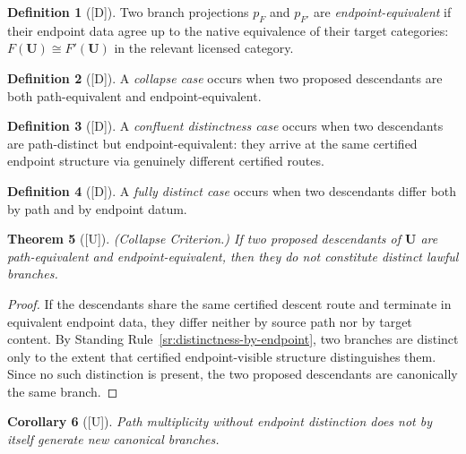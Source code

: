 \documentclass[12pt,oneside]{amsbook}
\theoremstyle{plain}
\newtheorem{theorem}{Theorem}[section]
\newtheorem{corollary}[theorem]{Corollary}
\theoremstyle{definition}
\newtheorem{definition}[theorem]{Definition}
\theoremstyle{remark}
\newcommand{\status}[1]{\textup{[#1]}}
\begin{document}
\begin{definition}[\status{D}]\label{def:endpoint-equiv}
Two branch projections $p_F$ and $p_{F'}$ are \emph{endpoint-equivalent}
if their endpoint data agree up to the native equivalence of their
target categories: $F(\mathbf{U}) \cong F'(\mathbf{U})$ in the
relevant licensed category.
\end{definition}

\begin{definition}[\status{D}]\label{def:collapse-case}
A \emph{collapse case} occurs when two proposed descendants are both
path-equivalent and endpoint-equivalent.
\end{definition}

\begin{definition}[\status{D}]\label{def:confluent-case}
A \emph{confluent distinctness case} occurs when two descendants are
path-distinct but endpoint-equivalent: they arrive at the same
certified endpoint structure via genuinely different certified routes.
\end{definition}

\begin{definition}[\status{D}]\label{def:fully-distinct}
A \emph{fully distinct case} occurs when two descendants differ both
by path and by endpoint datum.
\end{definition}

\begin{theorem}[\status{U}]\label{thm:collapse}
\textup{(Collapse Criterion.)}  If two proposed descendants of
$\mathbf{U}$ are path-equivalent and endpoint-equivalent, then they do
not constitute distinct lawful branches.
\end{theorem}

\begin{proof}
If the descendants share the same certified descent route and terminate
in equivalent endpoint data, they differ neither by source path nor by
target content.  By Standing Rule~\ref{sr:distinctness-by-endpoint},
two branches are distinct only to the extent that certified
endpoint-visible structure distinguishes them.  Since no such
distinction is present, the two proposed descendants are canonically
the same branch.
\end{proof}

\begin{corollary}[\status{U}]\label{cor:path-mult-no-branch}
Path multiplicity without endpoint distinction does not by itself
generate new canonical branches.
\end{corollary}
\end{document}
